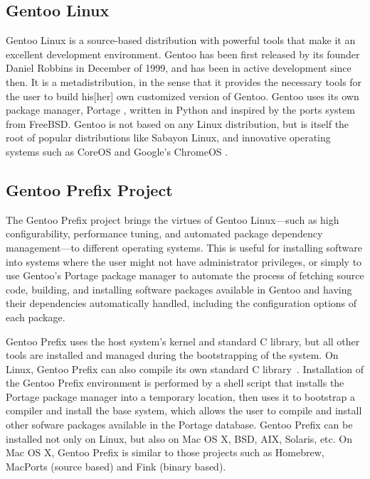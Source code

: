 \documentclass[a4paper,conference]{IEEEtran}
\begin{document}
\subsection{Gentoo Linux}

Gentoo Linux \cite{gentoo} is a source-based distribution with powerful
tools that make it an excellent development environment. Gentoo has been
first released by its founder Daniel Robbins in December of 1999, and
has been in active development since then. It is a metadistribution, in
the sense that it provides the necessary tools for the user to build
his[her] own customized version of Gentoo. Gentoo uses its own package
manager, Portage \cite{gentoo:portage}, written in Python and inspired
by the ports system from FreeBSD. Gentoo is not based on any Linux
distribution, but is itself the root of popular distributions like
Sabayon Linux, and innovative operating systems such as
CoreOS \cite{coreos} and Google's ChromeOS \cite{chromiumos}.

\subsection{Gentoo Prefix Project}

The Gentoo Prefix project \cite{gentoo:prefix} brings the virtues of
Gentoo Linux---such as high configurability, performance tuning, and
automated package dependency management---to different operating
systems. This is useful for installing software into systems where the
user might not have administrator privileges, or simply to use Gentoo's
Portage package manager to automate the process of fetching source code,
building, and installing software packages available in Gentoo and
having their dependencies automatically handled, including the
configuration options of each package.

Gentoo Prefix uses the host system's kernel and standard C library, but
all other tools are installed and managed during the bootstrapping of
the system. On Linux, Gentoo Prefix can also compile its own standard C library~\cite{gentoo:rap}.
Installation of the Gentoo
Prefix environment is performed by a shell script that installs the
Portage package manager into a temporary location, then uses it to
bootstrap a compiler and install the base system, which allows the user
to compile and install other sofware packages available in the Portage
database. Gentoo Prefix can be installed not only on Linux, but also on
Mac OS X, BSD, AIX, Solaris, etc.  On Mac OS X, Gentoo Prefix is similar to those
projects such as Homebrew, MacPorts (source based) and Fink (binary based).
\end{document}
